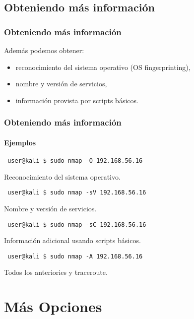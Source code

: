 \documentclass[aspectratio=169]{beamer}
\begin{document}
\subsection{Obteniendo m\'as informaci\'on}
\begin{frame}
    \frametitle{Obteniendo m\'as informaci\'on}

    Adem\'as podemos obtener:

    \begin{itemize}
        \item reconocimiento del sistema operativo (OS fingerprinting),
        \item nombre y versi\'on de servicios,
        \item informaci\'on provista por scripts b\'asicos.
    \end{itemize}

\end{frame}

\begin{frame}[fragile]
    \frametitle{Obteniendo m\'as informaci\'on}

    \framesubtitle{Ejemplos}

    \begin{lstlisting}
 user@kali $ sudo nmap -O 192.168.56.16
    \end{lstlisting}

    Reconocimiento del sistema operativo.

    \pause

    \begin{lstlisting}
 user@kali $ sudo nmap -sV 192.168.56.16
    \end{lstlisting}

    Nombre y versi\'on de servicios.

    \pause

    \begin{lstlisting}
 user@kali $ sudo nmap -sC 192.168.56.16
    \end{lstlisting}

    Informaci\'on adicional usando scripts b\'asicos.

    \pause

    \begin{lstlisting}
 user@kali $ sudo nmap -A 192.168.56.16
    \end{lstlisting}

    Todos los anteriories y traceroute.

\end{frame}

\section{M\'as Opciones}
\end{document}
